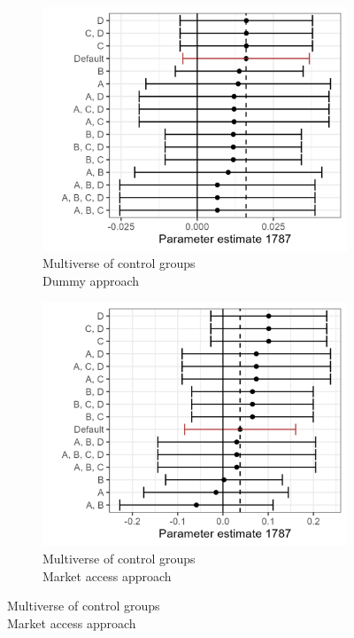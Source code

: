 \begin{figure}[H]
    \centering
    \caption{Multiverse of the effect in different comparison groups and parameter choices}
    \begin{subfigure}[b]{0.45\textwidth}
        \centering
        \caption{Multiverse of control groups\\Dummy approach} \label{fig:mult1}
        \includegraphics[width=\textwidth]{Plots/Regression_plots/Multiverse_dummy_1787.png}
    \end{subfigure}
    \hfill
    \begin{subfigure}[b]{0.45\textwidth}
        \centering
        \caption{Multiverse of control groups\\Market access approach} \label{fig:mult2}
        \includegraphics[width=\textwidth]{Plots/Regression_plots/Multiverse_MA_1787.png}

\end{subfigure}
\end{figure}
